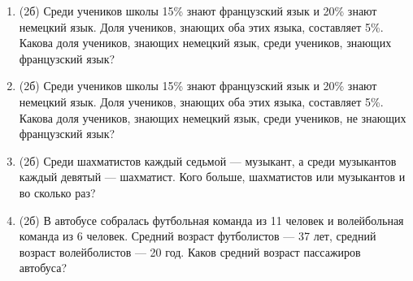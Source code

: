 \documentclass[a4paper, 12pt]{article}
\begin{document}
\begin{enumerate}[resume]
  \item (2б) Среди учеников школы 15\% знают французский язык и 20\% знают немецкий язык. Доля учеников, знающих оба этих языка, составляет 5\%. Какова доля учеников, знающих немецкий язык, среди учеников, знающих французский язык?
  \item (2б) Среди учеников школы 15\% знают французский язык и 20\% знают немецкий язык. Доля учеников, знающих оба этих языка, составляет 5\%. Какова доля учеников, знающих немецкий язык, среди учеников, не знающих французский язык?
  \item (2б) Среди шахматистов каждый седьмой — музыкант, а среди музыкантов каждый девятый — шахматист. Кого больше, шахматистов или музыкантов и во сколько раз?
  \item (2б) В автобусе собралась футбольная команда из 11 человек и волейбольная команда из 6 человек. Средний возраст футболистов — 37 лет, средний возраст волейболистов — 20 год. Каков средний возраст пассажиров автобуса?
\end{enumerate}
\end{document}
